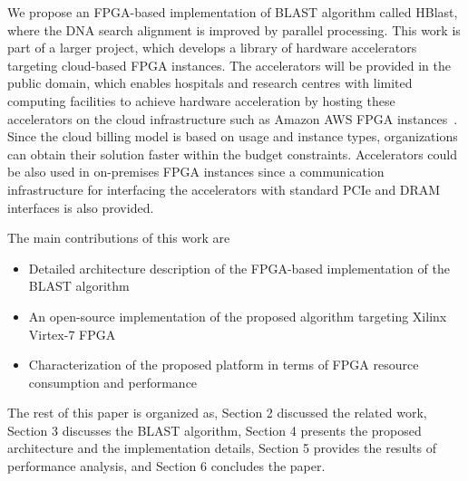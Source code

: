 We propose an FPGA-based implementation of BLAST algorithm called HBlast, where the DNA search alignment is improved by parallel processing. 
This work is part of a larger project, which develops a library of hardware accelerators targeting cloud-based FPGA instances.
The accelerators will be provided in the public domain, which enables hospitals and research centres with limited computing facilities to achieve hardware acceleration by hosting these accelerators on the cloud infrastructure such as Amazon AWS FPGA instances~\cite{aws2018}.
Since the cloud billing model is based on usage and instance types, organizations can obtain their solution faster within the budget constraints.
Accelerators could be also used in on-premises FPGA instances since a communication infrastructure for interfacing the accelerators with standard PCIe and DRAM interfaces is also provided.

The main contributions of this work are
\begin{itemize}
\item Detailed architecture description of the FPGA-based implementation of the BLAST algorithm
\item An open-source implementation of the proposed algorithm targeting Xilinx Virtex-7 FPGA
\item Characterization of the proposed platform in terms of FPGA resource consumption and performance
\end{itemize}

The rest of this paper is organized as, Section 2 discussed the related work, Section 3 discusses the BLAST algorithm, Section 4 presents the proposed architecture and the implementation details, Section 5 provides the results of performance analysis, and Section 6 concludes the paper.